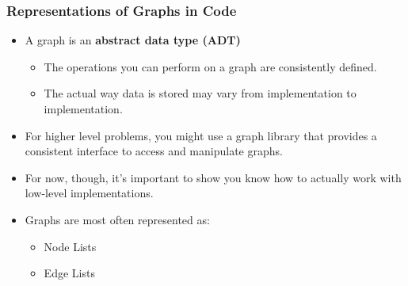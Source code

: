 \documentclass[aspectratio=169]{beamer}
\begin{document}
\begin{frame}
    \frametitle{Representations of Graphs in Code}
    \begin{itemize}
        \item A graph is an \textbf{abstract data type (ADT)}
        \pause
        \begin{itemize}
            \item The operations you can perform on a graph are consistently defined.
            \item The actual way data is stored may vary from implementation to implementation.
        \end{itemize}
        \pause
        \item For higher level problems, you might use a graph library that provides a consistent interface to access and manipulate graphs.
        \item For now, though, it's important to show you know how to actually work with low-level implementations.
        \pause
        \item Graphs are most often represented as:
        \begin{itemize}
            \item Node Lists
            \item Edge Lists
        \end{itemize}
    \end{itemize}
\end{frame}
\end{document}
